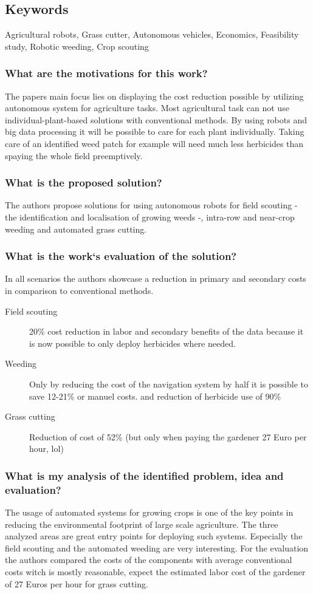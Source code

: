     \subsection*{Keywords}
    Agricultural robots, Grass cutter, Autonomous vehicles, Economics, Feasibility study, Robotic weeding, Crop scouting
    
     
    
    \subsubsection*{What are the motivations for this work?}
    The papers main focus lies on displaying the cost reduction possible by utilizing 
    autonomous system for agriculture tasks. Most agricultural task can not use individual-plant-based solutions with
    conventional methods. By using robots and big data processing it will be possible to care for each plant individually.
    Taking care of an identified weed patch for example will need much less herbicides than spaying the whole field preemptively.
    \subsubsection*{What is the proposed solution?}
    The authors propose solutions for using autonomous robots for field scouting - the identification and localisation 
    of growing weeds -, intra-row and near-crop weeding and automated grass cutting. 
    \subsubsection*{What is the work`s evaluation of the solution?}
    In all scenarios the authors showcase a reduction in primary and secondary costs in comparison to conventional methods.
    \begin{description}
        \item[Field scouting] 20\% cost reduction in labor and secondary benefits of the data because it is now possible to only deploy herbicides where needed.
        \item[Weeding] Only by reducing the cost of the navigation system by half it is possible to save 12-21\% or manuel costs. and reduction of herbicide use of 90\%   
        \item[Grass cutting] Reduction of cost of 52\% (but only when paying the gardener 27 Euro per hour, lol) 
    \end{description}
    \subsubsection*{What is my analysis of the identified problem, idea and evaluation?}
    The usage of automated systems for growing crops is one of the key points in reducing the environmental footprint
    of large scale agriculture. The three analyzed areas are great entry points for deploying such systems. Especially 
    the field scouting and the automated weeding are very interesting. For the evaluation the authors compared 
    the costs of the components with average conventional costs witch is mostly reasonable, expect the estimated
    labor cost of the gardener of 27 Euros per hour for grass cutting.

